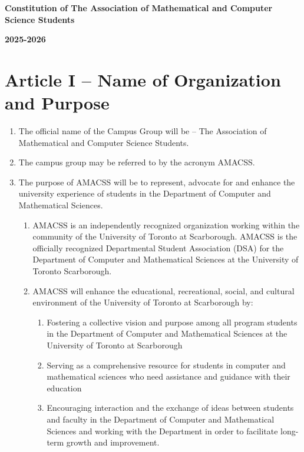 \documentclass[12pt,a4paper]{article}
\begin{document}
\begin{center}
{\Large\textbf{Constitution of The Association of Mathematical and Computer Science Students}}

\vspace{0.5cm}
{\large\textbf{2025-2026}}
\end{center}

\vspace{1cm}

\section*{Article I – Name of Organization and Purpose}

\begin{enumerate}
\item The official name of the Campus Group will be – The Association of Mathematical and Computer Science Students.

\item The campus group may be referred to by the acronym AMACSS.

\item The purpose of AMACSS will be to represent, advocate for and enhance the university experience of students in the Department of Computer and Mathematical Sciences.

\begin{enumerate}
\item AMACSS is an independently recognized organization working within the community of the University of Toronto at Scarborough. AMACSS is the officially recognized Departmental Student Association (DSA) for the Department of Computer and Mathematical Sciences at the University of Toronto Scarborough.

\item AMACSS will enhance the educational, recreational, social, and cultural environment of the University of Toronto at Scarborough by:

\begin{enumerate}
\item Fostering a collective vision and purpose among all program students in the Department of Computer and Mathematical Sciences at the University of Toronto at Scarborough

\item Serving as a comprehensive resource for students in computer and mathematical sciences who need assistance and guidance with their education

\item Encouraging interaction and the exchange of ideas between students and faculty in the Department of Computer and Mathematical Sciences and working with the Department in order to facilitate long-term growth and improvement.


\end{enumerate}
\end{enumerate}
\end{enumerate}
\end{document}
